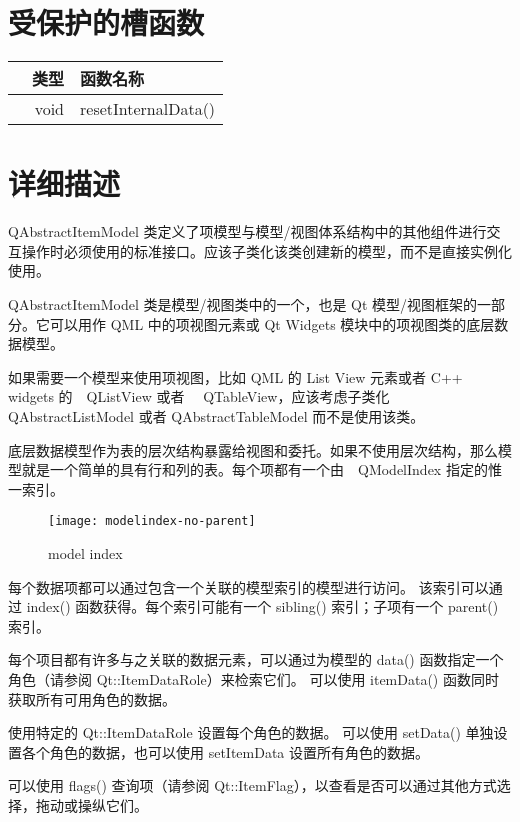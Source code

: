 \section{受保护的槽函数}

\splitLine

\begin{tabular}{|r|l|}
\hline
类型　	&函数名称\\
\hline
void	&resetInternalData()\\
\hline
\end{tabular}

\section{详细描述}

\splitLine

QAbstractItemModel 类定义了项模型与模型/视图体系结构中的其他组件进行交互操作时必须使用的标准接口。应该子类化该类创建新的模型，而不是直接实例化使用。

QAbstractItemModel 类是模型/视图类中的一个，也是 Qt 模型/视图框架的一部分。它可以用作 QML 中的项视图元素或 Qt Widgets 模块中的项视图类的底层数据模型。

如果需要一个模型来使用项视图，比如 QML 的 List View 元素或者 C++ widgets 的　QListView 或者　 QTableView，应该考虑子类化 QAbstractListModel 或者 QAbstractTableModel 而不是使用该类。

底层数据模型作为表的层次结构暴露给视图和委托。如果不使用层次结构，那么模型就是一个简单的具有行和列的表。每个项都有一个由　QModelIndex 指定的惟一索引。

\begin{figure}[hbt!]  
	\centering
    \texttt{[image: modelindex-no-parent]}
	\caption{model index}
\end{figure}

每个数据项都可以通过包含一个关联的模型索引的模型进行访问。
该索引可以通过 index() 函数获得。每个索引可能有一个 sibling() 索引；子项有一个 parent()　索引。

每个项目都有许多与之关联的数据元素，可以通过为模型的 data() 函数指定一个角色（请参阅 Qt::ItemDataRole）来检索它们。
可以使用 itemData() 函数同时获取所有可用角色的数据。

使用特定的 Qt::ItemDataRole 设置每个角色的数据。
可以使用 setData() 单独设置各个角色的数据，也可以使用 setItemData 设置所有角色的数据。

可以使用 flags() 查询项（请参阅 Qt::ItemFlag），以查看是否可以通过其他方式选择，拖动或操纵它们。

